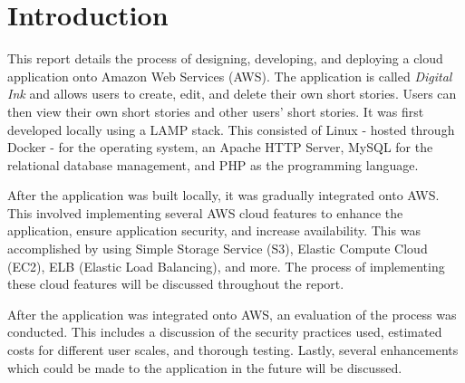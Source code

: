 \chapter{Introduction}\label{ch:introduction}
\setcounter{page}{1}

This report details the process of designing, developing, and deploying a cloud application onto Amazon Web Services (AWS).
The application is called \textit{Digital Ink} and allows users to create, edit, and delete their own short stories.
Users can then view their own short stories and other users' short stories.
It was first developed locally using a LAMP stack.
This consisted of Linux - hosted through Docker - for the operating system, an Apache HTTP Server, MySQL for the relational database management, and PHP as the programming language.

After the application was built locally, it was gradually integrated onto AWS\@.
This involved implementing several AWS cloud features to enhance the application, ensure application security, and increase availability.
This was accomplished by using Simple Storage Service (S3), Elastic Compute Cloud (EC2), ELB (Elastic Load Balancing), and more.
The process of implementing these cloud features will be discussed throughout the report.

After the application was integrated onto AWS, an evaluation of the process was conducted.
This includes a discussion of the security practices used, estimated costs for different user scales, and thorough testing.
Lastly, several enhancements which could be made to the application in the future will be discussed.